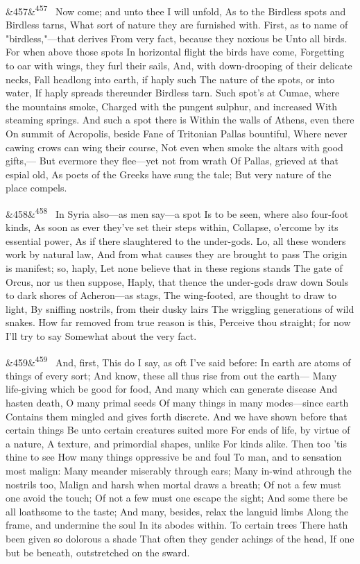 \documentclass[12pt]{article}
\newcommand{\para}[1][]{\par\noindent\ifx&#1&\else\textsuperscript{\footnotesize #1}~\fi}
\begin{document}
\para[457] Now come; and unto thee I will unfold, As to the Birdless spots and Birdless tarns, What sort of nature they are furnished with. First, as to name of "birdless,"---that derives From very fact, because they noxious be Unto all birds. For when above those spots In horizontal flight the birds have come, Forgetting to oar with wings, they furl their sails, And, with down-drooping of their delicate necks, Fall headlong into earth, if haply such The nature of the spots, or into water, If haply spreads thereunder Birdless tarn. Such spot's at Cumae, where the mountains smoke, Charged with the pungent sulphur, and increased With steaming springs. And such a spot there is Within the walls of Athens, even there On summit of Acropolis, beside Fane of Tritonian Pallas bountiful, Where never cawing crows can wing their course, Not even when smoke the altars with good gifts,--- But evermore they flee---yet not from wrath Of Pallas, grieved at that espial old, As poets of the Greeks have sung the tale; But very nature of the place compels.

\para[458] In Syria also---as men say---a spot Is to be seen, where also four-foot kinds, As soon as ever they've set their steps within, Collapse, o'ercome by its essential power, As if there slaughtered to the under-gods. Lo, all these wonders work by natural law, And from what causes they are brought to pass The origin is manifest; so, haply, Let none believe that in these regions stands The gate of Orcus, nor us then suppose, Haply, that thence the under-gods draw down Souls to dark shores of Acheron---as stags, The wing-footed, are thought to draw to light, By sniffing nostrils, from their dusky lairs The wriggling generations of wild snakes. How far removed from true reason is this, Perceive thou straight; for now I'll try to say Somewhat about the very fact.

\para[459] And, first, This do I say, as oft I've said before: In earth are atoms of things of every sort; And know, these all thus rise from out the earth--- Many life-giving which be good for food, And many which can generate disease And hasten death, O many primal seeds Of many things in many modes---since earth Contains them mingled and gives forth discrete. And we have shown before that certain things Be unto certain creatures suited more For ends of life, by virtue of a nature, A texture, and primordial shapes, unlike For kinds alike. Then too 'tis thine to see How many things oppressive be and foul To man, and to sensation most malign: Many meander miserably through ears; Many in-wind athrough the nostrils too, Malign and harsh when mortal draws a breath; Of not a few must one avoid the touch; Of not a few must one escape the sight; And some there be all loathsome to the taste; And many, besides, relax the languid limbs Along the frame, and undermine the soul In its abodes within. To certain trees There hath been given so dolorous a shade That often they gender achings of the head, If one but be beneath, outstretched on the sward.
\end{document}
